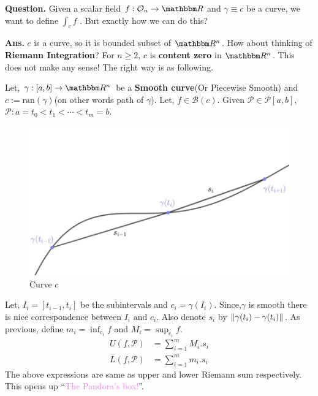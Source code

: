 \documentclass[Analysis-3]{subfiles}
\begin{document}
\textbf{Question.} Given a scalar field $f : \Op{n} \to \R$ and $\gamma \equiv c$ be a curve, we want to define $\int_c f$ . But exactly how we can do this?

\textbf{Ans.} $c$ is a curve, so it is bounded subset of $\R^n$. How about thinking of \textbf{Riemann Integration}? For $n \ge 2$, $c$ is \textbf{content zero} in $\R^n$. This does not make any sense! The right way is as following.

\vspace*{0.5cm}

Let, $\gamma :[a,b]\to \R^n$ be a \textbf{Smooth curve}(Or Piecewise Smooth) and $c:= \text{ran}(\gamma)$(on other words path of $\gamma$). Let, $f \in \mathscr{B}(c)$. Given $\mathcal{P} \in \mathscr{P}[a,b]$, $\mathcal{P} : a = t_0<t_1<\cdots <t_m = b$.

\vspace{0.2cm}

\begin{figure}
    \centering
    \includegraphics[width=.98\linewidth]{figures/lec-23.1.png}
    \caption{Curve $c$}
\end{figure}
Let, $I_i = [t_{i-1},t_i]$ be the subintervals and $c_i = \gamma(I_i)$.
Since,$\gamma$ is smooth there is nice correspondence between $I_i$ and $c_i$. Also denote $s_i$ by $\norm{\gamma(t_i) - \gamma(t_i)}$. As previous, define $m_i = \inf_{c_i}f$ and $M_i = \sup_{c_i}f$.
\begin{align*}
    U(f,\mathcal{P}) & = \sum_{i=1}^{m}M_i.s_i \\
    L(f,\mathcal{P}) & = \sum_{i=1}^{m}m_i.s_i
\end{align*}
The above expressions are same as upper and
\vspace{0.05cm}
lower Riemann sum respectively. This opens up ``\textcolor{violet}{The Pandora's box!}''.
\vspace{0.3cm}
\end{document}
